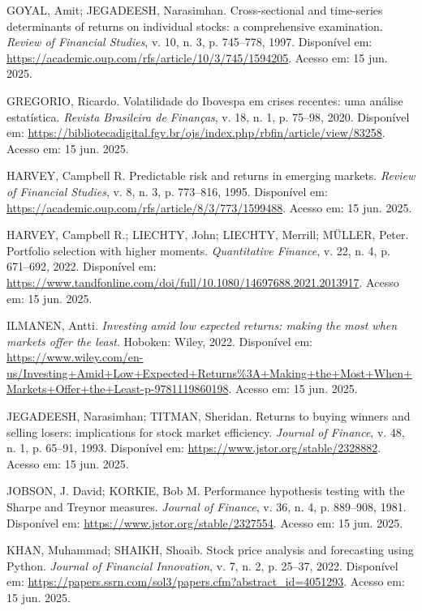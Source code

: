 \noindent
GOYAL, Amit; JEGADEESH, Narasimhan. Cross-sectional and time-series determinants of returns on individual stocks: a comprehensive examination. \textit{Review of Financial Studies}, v. 10, n. 3, p. 745--778, 1997. Disponível em: \url{https://academic.oup.com/rfs/article/10/3/745/1594205}. Acesso em: 15 jun. 2025.

\noindent
GREGORIO, Ricardo. Volatilidade do Ibovespa em crises recentes: uma análise estatística. \textit{Revista Brasileira de Finanças}, v. 18, n. 1, p. 75--98, 2020. Disponível em: \url{https://bibliotecadigital.fgv.br/ojs/index.php/rbfin/article/view/83258}. Acesso em: 15 jun. 2025.

\noindent
HARVEY, Campbell R. Predictable risk and returns in emerging markets. \textit{Review of Financial Studies}, v. 8, n. 3, p. 773--816, 1995. Disponível em: \url{https://academic.oup.com/rfs/article/8/3/773/1599488}. Acesso em: 15 jun. 2025.

\noindent
HARVEY, Campbell R.; LIECHTY, John; LIECHTY, Merrill; MÜLLER, Peter. Portfolio selection with higher moments. \textit{Quantitative Finance}, v. 22, n. 4, p. 671--692, 2022. Disponível em: \url{https://www.tandfonline.com/doi/full/10.1080/14697688.2021.2013917}. Acesso em: 15 jun. 2025.

\noindent
ILMANEN, Antti. \textit{Investing amid low expected returns: making the most when markets offer the least}. Hoboken: Wiley, 2022. Disponível em: \url{https://www.wiley.com/en-us/Investing+Amid+Low+Expected+Returns%3A+Making+the+Most+When+Markets+Offer+the+Least-p-9781119860198}. Acesso em: 15 jun. 2025.

\noindent
JEGADEESH, Narasimhan; TITMAN, Sheridan. Returns to buying winners and selling losers: implications for stock market efficiency. \textit{Journal of Finance}, v. 48, n. 1, p. 65--91, 1993. Disponível em: \url{https://www.jstor.org/stable/2328882}. Acesso em: 15 jun. 2025.

\noindent
JOBSON, J. David; KORKIE, Bob M. Performance hypothesis testing with the Sharpe and Treynor measures. \textit{Journal of Finance}, v. 36, n. 4, p. 889--908, 1981. Disponível em: \url{https://www.jstor.org/stable/2327554}. Acesso em: 15 jun. 2025.

\noindent
KHAN, Muhammad; SHAIKH, Shoaib. Stock price analysis and forecasting using Python. \textit{Journal of Financial Innovation}, v. 7, n. 2, p. 25--37, 2022. Disponível em: \url{https://papers.ssrn.com/sol3/papers.cfm?abstract_id=4051293}. Acesso em: 15 jun. 2025.

